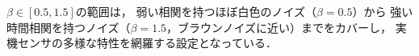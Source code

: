 $\beta \in [0.5, 1.5]$の範囲は，
弱い相関を持つほぼ白色のノイズ（$\beta = 0.5$）から
強い時間相関を持つノイズ（$\beta = 1.5$，ブラウンノイズに近い）までをカバーし，
実機センサの多様な特性を網羅する設定となっている．

